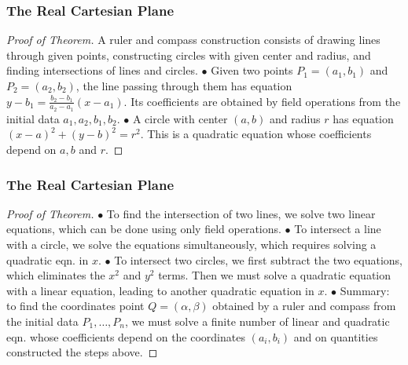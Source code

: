 \documentclass[compress,mathserif,serif]{beamer}
\begin{document}
\begin{frame}
\frametitle{The Real Cartesian Plane}
\begin{proof}[Proof of Theorem]\let\qed\relax A ruler and compass construction consists of drawing
lines through given points, constructing circles with given center and radius,
and finding intersections of lines and circles.
\pause
\newline
\newline
$\bullet$ Given two points $P_1=(a_1,b_1)$ and $P_2=(a_2,b_2)$, the line passing through them has equation $ y-b_1= \frac{b_2-b_1}{a_2-a_1}(x-a_1).$ Its coefficients are obtained by field operations from the initial data $a_1,a_2,b_1,b_2$.
\pause
\newline
\newline
$\bullet$ A circle with center $(a,b)$ and radius $r$ has equation
  $(x-a)^2 + (y-b)^2=r^2.$
This is a quadratic equation whose coefficients depend on $a,b$ and $r$.
\end{proof}
\end{frame}


\begin{frame}
\frametitle{The Real Cartesian Plane}
\begin{proof}[Proof of Theorem]\let\qed\relax
$\bullet$ To find the intersection of two lines, we solve two linear equations, which can be done using only field operations.
\pause
\newline
\newline
$\bullet$ To intersect a line with a circle, we solve the equations simultaneously, which requires solving a quadratic eqn. in $x$.
\pause
\newline
\newline
$\bullet$ To intersect two circles, we first subtract the two equations, which eliminates the $x^2$ and $y^2$ terms. Then we must solve a quadratic equation with a linear equation, leading to another quadratic equation in $x$.
\pause
\newline
\newline
$\bullet$ Summary: to find the coordinates point $Q=( \alpha, \beta)$ obtained by a ruler and compass from the initial data $P_1, \dots , P_n$, we must solve a finite number of linear and quadratic eqn. whose coefficients depend on the coordinates $(a_i,b_i)$ and on quantities constructed the steps above.
\end{proof}
\end{frame}
\end{document}
